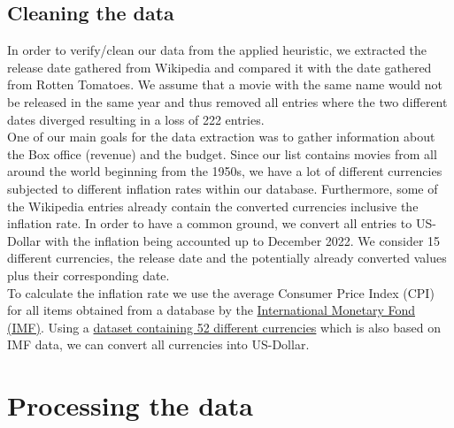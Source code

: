\documentclass{article}
\begin{document}
\subsection{Cleaning the data}
    In order to verify/clean our data from the applied heuristic, we extracted the release date gathered from Wikipedia and compared it with the date gathered from Rotten Tomatoes. We assume that a movie with the same name would not be released in the same year and thus removed all entries where the two different dates diverged resulting in a loss of 222 entries. \\
    One of our main goals for the data extraction was to gather information about the Box office (revenue) and the budget. Since our list contains movies from all around the world beginning from the 1950s, we have a lot of different currencies subjected to different inflation rates within our database. Furthermore, some of the Wikipedia entries already contain the converted currencies inclusive the inflation rate. In order to have a common ground, we convert all entries to US-Dollar with the inflation being accounted up to December 2022. We consider 15 different currencies, the release date and the potentially already converted values plus their corresponding date.\\
    To calculate the inflation rate we use the average Consumer Price Index (CPI) for all items obtained from a database by the \href{https://data.imf.org/?sk=388dfa60-1d26-4ade-b505-a05a558d9a42}{International Monetary Fond (IMF)}. Using a \href{https://www.kaggle.com/datasets/thebasss/currency-exchange-rates}{dataset containing 52 different currencies} which is also based on IMF data, we can convert all currencies into US-Dollar.


\section{Processing the data}
    
\end{document}
